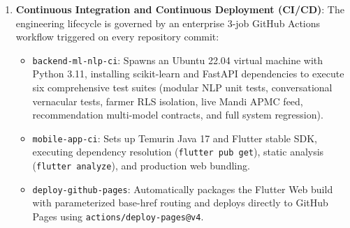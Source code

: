 \begin{enumerate}
    \item \textbf{Continuous Integration and Continuous Deployment (CI/CD)}: The engineering lifecycle is governed by an enterprise 3-job GitHub Actions workflow triggered on every repository commit:
    \begin{itemize}
        \item \texttt{backend-ml-nlp-ci}: Spawns an Ubuntu 22.04 virtual machine with Python 3.11, installing scikit-learn and FastAPI dependencies to execute six comprehensive test suites (modular NLP unit tests, conversational vernacular tests, farmer RLS isolation, live Mandi APMC feed, recommendation multi-model contracts, and full system regression).
        \item \texttt{mobile-app-ci}: Sets up Temurin Java 17 and Flutter stable SDK, executing dependency resolution (\texttt{flutter pub get}), static analysis (\texttt{flutter analyze}), and production web bundling.
        \item \texttt{deploy-github-pages}: Automatically packages the Flutter Web build with parameterized base-href routing and deploys directly to GitHub Pages using \texttt{actions/deploy-pages@v4}.
    \end{itemize}
\end{enumerate}

\chapterend
